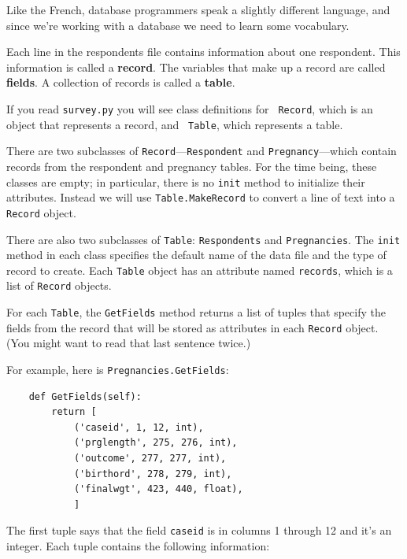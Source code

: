 \documentclass[12pt]{book}
\begin{document}
Like the French, database programmers speak a slightly
different language, and since we're working with a database we need
to learn some vocabulary.

Each line in the respondents file contains information about one
respondent.  This information is called a {\bf record}.  The
variables that make up a record are called {\bf fields}.  A
collection of records is called a {\bf table}.

If you read {\tt survey.py} you will see class definitions for {\tt
  Record}, which is an object that represents a record, and {\tt
  Table}, which represents a table.

There are two subclasses of
{\tt Record}---{\tt Respondent} and {\tt Pregnancy}---which
contain records from the respondent and pregnancy tables.
For the time being, these classes are empty; in particular, there
is no {\tt init} method to initialize their attributes.  Instead
we will use {\tt Table.MakeRecord} to convert a line of text into
a {\tt Record} object.

There are also two subclasses of {\tt Table}: {\tt Respondents}
and {\tt Pregnancies}.  The {\tt init} method in each class
specifies the default name of the data file and the type of
record to create.  Each {\tt Table} object has an attribute
named {\tt records}, which is a list of {\tt Record} objects.

For each {\tt Table}, the {\tt GetFields} method returns
a list of tuples that specify the fields from the record that
will be stored as attributes in each {\tt Record} object.  (You
might want to read that last sentence twice.)

For example, here is {\tt Pregnancies.GetFields}:

\begin{verbatim}
    def GetFields(self):
        return [
            ('caseid', 1, 12, int),
            ('prglength', 275, 276, int),
            ('outcome', 277, 277, int),
            ('birthord', 278, 279, int),
            ('finalwgt', 423, 440, float),
            ]
\end{verbatim}

The first tuple says that the field {\tt caseid} is in columns
1 through 12 and it's an integer.  Each tuple contains the following
information:
\end{document}
